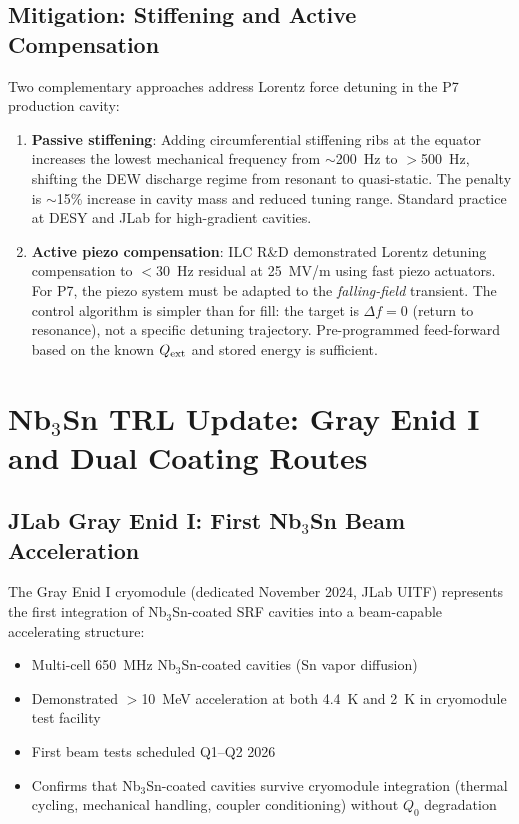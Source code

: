 \documentclass[11pt]{article}
\begin{document}
\subsection{Mitigation: Stiffening and Active Compensation}

Two complementary approaches address Lorentz force detuning in
the P7 production cavity:

\begin{enumerate}
  \item \textbf{Passive stiffening}: Adding circumferential
    stiffening ribs at the equator increases the lowest mechanical
    frequency from $\sim$200~Hz to $>$500~Hz, shifting the DEW
    discharge regime from resonant to quasi-static. The penalty
    is $\sim$15\% increase in cavity mass and reduced tuning range.
    Standard practice at DESY and JLab for high-gradient cavities.

  \item \textbf{Active piezo compensation}: ILC R\&D demonstrated
    Lorentz detuning compensation to $<$30~Hz residual at 25~MV/m
    using fast piezo actuators. For P7, the piezo system must be
    adapted to the \emph{falling-field} transient. The control
    algorithm is simpler than for fill: the target is
    $\Delta f = 0$ (return to resonance), not a specific detuning
    trajectory. Pre-programmed feed-forward based on the known
    $Q_{\rm ext}$ and stored energy is sufficient.
\end{enumerate}

\section{Nb$_3$Sn TRL Update: Gray Enid I and Dual Coating Routes}
\label{sec:Nb3Sn-update}

\subsection{JLab Gray Enid I: First Nb$_3$Sn Beam Acceleration}

The Gray Enid I cryomodule (dedicated November 2024, JLab UITF)
represents the first integration of Nb$_3$Sn-coated SRF cavities
into a beam-capable accelerating structure:
\begin{itemize}[nosep]
  \item Multi-cell 650~MHz Nb$_3$Sn-coated cavities (Sn vapor
    diffusion)
  \item Demonstrated $>$10~MeV acceleration at both 4.4~K and 2~K
    in cryomodule test facility
  \item First beam tests scheduled Q1--Q2 2026
  \item Confirms that Nb$_3$Sn-coated cavities survive cryomodule
    integration (thermal cycling, mechanical handling, coupler
    conditioning) without $Q_0$ degradation
\end{itemize}
\end{document}
